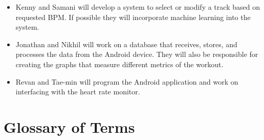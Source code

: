 \documentclass[letterpaper,english, 12pt]{scrreprt}
\begin{document}
\begin{itemize}
	\item Kenny and Samani will develop a system to select or modify a track based on requested BPM. If possible they will incorporate machine learning into the system.
	\item Jonathan and Nikhil will work on a database that receives, stores, and processes the data from the Android device. They will also be responsible for creating the graphs that measure different metrics of the workout.
	\item Revan and Tae-min will program the Android application and work on interfacing with the heart rate monitor.
\end{itemize}

\section{Glossary of Terms}
\end{document}
